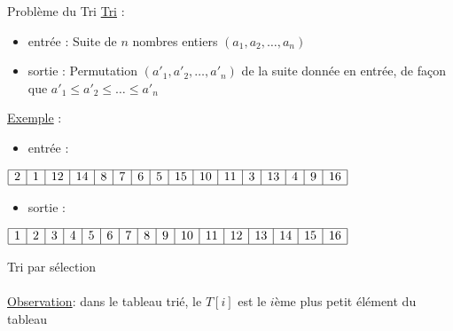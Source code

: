 \begin{frame}{Problème du Tri}
  \underline{Tri} :
  \begin{itemize}
  \item entrée : Suite de $n$ nombres entiers $(a_1,a_2,\ldots ,a_n)$
  \item sortie : Permutation $(a'_1,a'_2,\ldots ,a'_n)$ de la suite donnée en entrée, de façon que $a'_1\leq a'_2 \leq \ldots \leq a'_n$
  \end{itemize}



  \underline{Exemple} :\\
  \begin{itemize}
  \item   entrée :
  \end{itemize}
 $ 
  \begin{array}{|*{16}{c|}}
    \hline
    2 & 1 & 12 & 14 & 8 & 7 & 6 & 5 & 15 & 10 & 11 & 3 & 13 & 4 & 9 & 16 \\
      \hline
    \end{array}
    $
    \begin{itemize}
    \item  sortie :
    \end{itemize} 
    $
    \begin{array}{|*{16}{c|}}
      \hline
      1 & 2 & 3 & 4 & 5 & 6 & 7 & 8 & 9 & 10 & 11 & 12 & 13 & 14 & 15 & 16 \\
      \hline
    \end{array}
    $
\end{frame}

\begin{frame}{Tri par sélection }
~\\~\\
\underline{Observation}: dans le tableau trié, le $T[i]$ est le $i$ème plus petit élément du tableau
~\\~\\
\end{frame}

